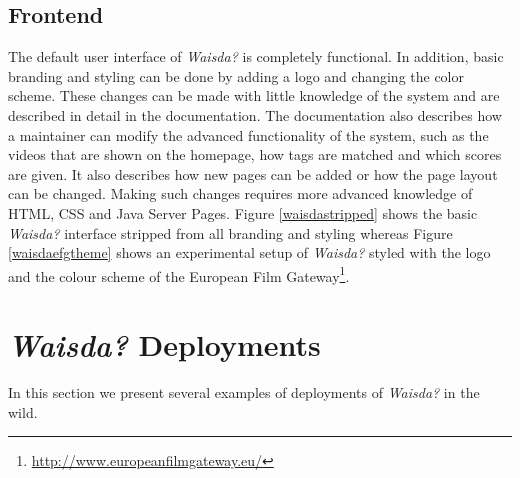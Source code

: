 \subsection{Frontend}
The default user interface of \textit{Waisda?} is completely functional. In addition, basic branding and styling can be done by adding a logo and changing the color scheme. These changes can be made with little knowledge of the system and are described in detail in the documentation. The documentation also describes how a maintainer can modify the advanced functionality of the system, such as the videos that are shown on the homepage, how tags are matched and which scores are given. It also describes how new pages can be added or how the page layout can be changed. Making such changes requires more advanced knowledge of HTML, CSS and Java Server Pages. Figure \ref{waisdastripped} shows the basic \textit{Waisda?} interface stripped from all branding and styling whereas Figure \ref{waisdaefgtheme} shows an experimental setup of \textit{Waisda?} styled with the logo and the colour scheme of the European Film Gateway\footnote{\url{http://www.europeanfilmgateway.eu/}}.

\section{\textit{Waisda?} Deployments}
In this section we present several examples of deployments of \textit{Waisda?} in the wild.

